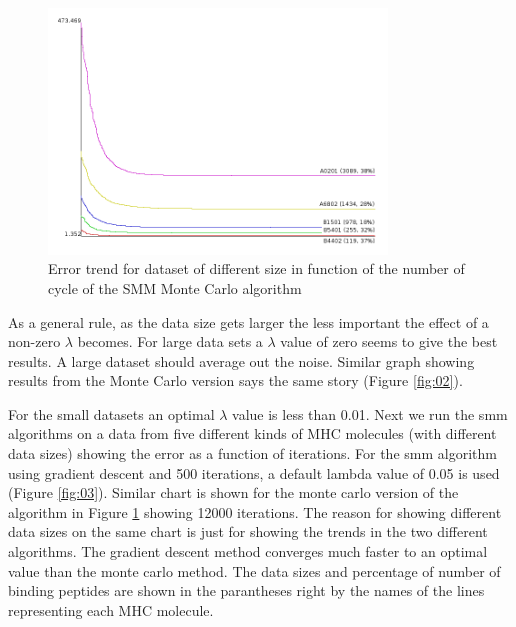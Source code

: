 \documentclass{bioinfo}
\begin{document}
\begin{application}
\begin{figure}[!tpb]
\centerline{\includegraphics[width=9cm]{fig/smm_mc_error.png}}
\caption{Error trend for dataset of different size in function of the number of cycle of the SMM Monte Carlo algorithm}
\label{fig:04}
\end{figure}

\par As a general rule, as the data size gets larger the less important the effect of a non-zero $\lambda$ becomes. For large data sets a $\lambda$ value of zero seems to give the best results. A large dataset should average out the noise. Similar graph showing results from the Monte Carlo version says the same story (Figure \ref{fig:02}).
\par For the small datasets an optimal $\lambda$ value is  less than 0.01. Next we run the smm algorithms on a data from five different kinds of MHC molecules (with different data sizes) showing the error as a function of iterations. For the smm algorithm using gradient descent and 500 iterations, a default lambda value of 0.05 is used (Figure \ref{fig:03}). Similar chart is shown for the monte carlo version of the algorithm in Figure \ref{fig:04} showing 12000 iterations. The reason for showing different data sizes on the same chart is just for showing the trends in the two different algorithms. The gradient descent method converges much faster to an optimal value than the monte carlo method. The data sizes and percentage of number of binding peptides are shown in the parantheses right by the names of the lines representing each MHC molecule.


\end{application}
\end{document}
